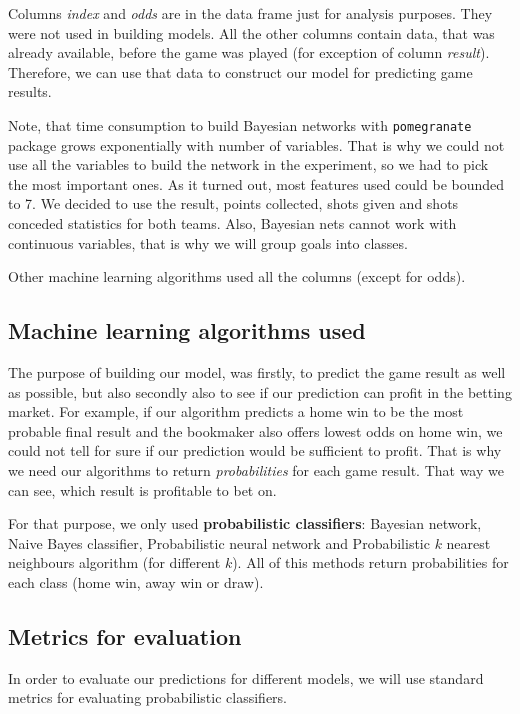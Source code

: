 \documentclass[conference]{IEEEtran}
\begin{document}
Columns \textit{index} and \textit{odds} are in the data frame just for analysis purposes. 
They were not used in building models. All the other columns contain data, that was already
available, before the game was played (for exception of column \textit{result}). Therefore, 
we can use that data to construct our model for predicting game results.

Note, that time consumption to build Bayesian networks with \texttt{pomegranate} package 
grows exponentially with number of variables. That is why we could not use all the variables 
to build the network in the experiment, so we had to pick the most important ones. As it 
turned out, most features used could be bounded to 7. We decided to use the 
result, points collected, shots given and shots conceded statistics for both teams. Also, 
Bayesian nets cannot work with continuous variables, that is why we will group goals into
classes.

Other machine learning algorithms used all the columns (except for odds).

\subsection{Machine learning algorithms used}

The purpose of building our model, was firstly, to predict the game result as well as possible,
but also secondly also to see if our prediction can profit in the betting market. For example,
if our algorithm predicts a home win to be the most probable final result and the bookmaker
also offers lowest odds on home win, we could not tell for sure if our prediction would be
sufficient to profit. That is why we need our algorithms to return \textit{probabilities} for
each game result. That way we can see, which result is profitable to bet on.

For that purpose, we only used \textbf{probabilistic classifiers}: Bayesian network, Naive
Bayes classifier, Probabilistic neural network and Probabilistic $k$ nearest neighbours
algorithm (for different $k$). All of this methods return probabilities for each class (home
win, away win or draw).

\subsection{Metrics for evaluation}

In order to evaluate our predictions for different models, we will use standard metrics for evaluating probabilistic classifiers. 
\end{document}
